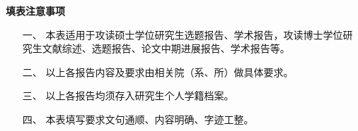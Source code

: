 \begin{titlepage}
    \begin{CJK*}{UTF8}{gkai}
\centering    
    
    {\fontsize{24}{60}
    \textbf{填表注意事项}} \\
    
\vspace{2cm}

\fontsize{14}{1.5pt}

\begin{itemize}

    \setlength\itemsep{20pt}
    
    \item[一、]	本表适用于攻读硕士学位研究生选题报告、学术报告，攻读博士学位研究生文献综述、选题报告、论文中期进展报告、学术报告等。

    \item[二、]	以上各报告内容及要求由相关院（系、所）做具体要求。
    
    \item[三、]	以上各报告均须存入研究生个人学籍档案。 
    
    \item[四、]   本表填写要求文句通顺、内容明确、字迹工整。 

\end{itemize}


\end{CJK*} 
\end{titlepage}